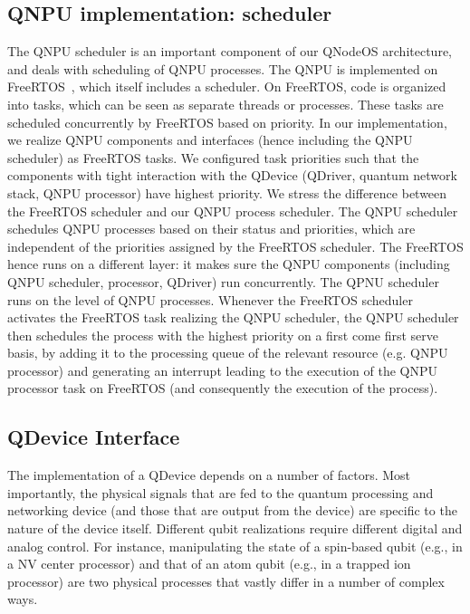 \subsection{QNPU implementation: scheduler}
\label{sec:qnpu_impl_scheduler}
The \ac{QNPU} scheduler is an important component of our \ac{QNodeOS} architecture, and deals with scheduling of QNPU processes. The QNPU is implemented on FreeRTOS~\cite{freertos}, which itself includes a scheduler. On FreeRTOS, code is organized into tasks, which can be seen as separate threads or processes. These tasks are scheduled concurrently by FreeRTOS based on priority. In our implementation, we realize QNPU components and interfaces (hence including the QNPU scheduler) as FreeRTOS tasks. We configured task priorities such that the components with tight interaction with the QDevice (\ac{QDriver}, quantum network stack, QNPU processor) have highest priority.
We stress the difference between the FreeRTOS scheduler and our QNPU process scheduler. 
The QNPU scheduler schedules QNPU processes based on their status and priorities, which are independent of the priorities assigned by the FreeRTOS scheduler.
The FreeRTOS hence runs on a different layer: it makes sure the QNPU components (including QNPU scheduler, processor, \ac{QDriver}) run concurrently. The QPNU scheduler runs on the level of QNPU processes. Whenever the FreeRTOS scheduler activates the FreeRTOS task realizing the QNPU scheduler, the QNPU scheduler then schedules the process with the highest priority on a first come first serve basis, by adding it to the processing queue of the relevant resource (e.g. QNPU processor) and generating an interrupt leading to the execution of the QNPU processor task on FreeRTOS (and consequently the execution of the process).

\subsection{QDevice Interface}
\label{sec:appendix-qdevice}

The implementation of a \ac{QDevice} depends on a number of factors. Most importantly, the physical signals that are fed to the quantum processing and networking device (and those that are output from the device) are specific to the nature of the device itself. Different qubit realizations require different digital and analog control. For instance, manipulating the state of a spin-based qubit (e.g., in a \ac{NV} center processor) and that of an atom qubit (e.g., in a trapped ion processor) are two physical processes that vastly differ in a number of complex ways.

